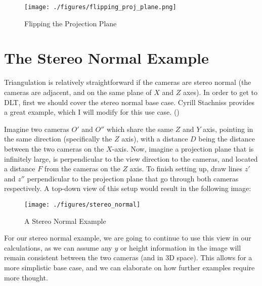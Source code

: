 \documentclass[
    12pt,
    twoside,
    bibstyle=chicago,
    headerstyle=uppercase,
	bibfile=thesis.bib
]{reedthesis}
\begin{document}
\begin{figure}[h]
	    \centering
	    \texttt{[image: ./figures/flipping\_proj\_plane.png]}
		
	    \caption{Flipping the Projection Plane}
	 \label{Flipping the Projection Plane}
	\end{figure}

\section{The Stereo Normal Example}

Triangulation is relatively straightforward if the cameras are stereo normal (the cameras are adjacent, and on the same plane of $X$ and $Z$ axes). In order to get to DLT, first we should cover the stereo normal base case. Cyrill Stachniss provides a great example, which I will modify for this use case. (\autocite{stachniss_lecture_2021})

	Imagine two cameras $O'$ and $O''$ which share the same $Z$ and $Y$ axis, pointing in the same direction (specifically the $Z$ axis), with a distance $D$ being the distance between the two cameras on the $X$-axis. Now, imagine a projection plane that is infinitely large, is perpendicular to the view direction to the cameras, and located a distance $F$ from the cameras on the $Z$ axis. To finish setting up, draw lines $z'$ and $z''$ perpendicular to the projection plane that go through both cameras respectively. A top-down view of this setup would result in the following image: 
	
	\begin{figure}[h]
	   
	       \centering
	        
	    \texttt{[image: ./figures/stereo\_normal]}
	     \caption{A Stereo Normal Example}
	 \label{A Stereo Normal Example}
	\end{figure}

For our stereo normal example, we are going to continue to use this view in our calculations, as we can assume any $y$ or height information in the image will remain consistent between the two cameras (and in 3D space). This allows for a more simplistic base case, and we can elaborate on how further examples require more thought.
\end{document}
